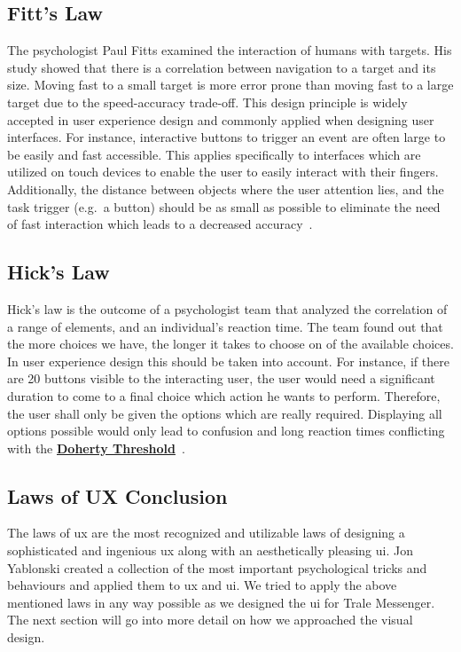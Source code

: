 \subsection{Fitt's Law}\label{subsec:fitt's-law}
The psychologist Paul Fitts examined the interaction of humans with targets.
His study showed that there is a correlation between navigation to a target and its size.
Moving fast to a small target is more error prone than moving fast to a large target due to the speed-accuracy trade-off.
This design principle is widely accepted in user experience design and commonly applied when designing user interfaces.
For instance, interactive buttons to trigger an event are often large to be easily and fast accessible.
This applies specifically to interfaces which are utilized on touch devices to enable the user to easily interact with
their fingers.
Additionally, the distance between objects where the user attention lies, and the task trigger (e.g.\ a button) should be
as small as possible to eliminate the need of fast interaction which leads to a decreased accuracy~\cite{lawsofuxFL}.

\subsection{Hick's Law}\label{subsec:hick's-law}
Hick's law is the outcome of a psychologist team that analyzed the correlation of a range of elements, and an
individual's reaction time.
The team found out that the more choices we have, the longer it takes to choose on of the available choices.
In user experience design this should be taken into account.
For instance, if there are 20 buttons visible to the interacting user, the user would need a significant duration to
come to a final choice which action he wants to perform.
Therefore, the user shall only be given the options which are really required.
Displaying all options possible would only lead to confusion and long reaction times conflicting with the
\textbf{\hyperref[subsec:doherty-threshold]{Doherty Threshold}}~\cite{lawsofuxHL}.

\subsection{Laws of UX Conclusion}\label{subsec:laws-of-ux-conclusion}
The laws of \ac{ux} are the most recognized and utilizable laws of designing a sophisticated and ingenious \ac{ux}
along with an aesthetically pleasing \ac{ui}.
Jon Yablonski created a collection of the most important psychological tricks and behaviours and applied them to
\ac{ux} and \ac{ui}.
We tried to apply the above mentioned laws in any way possible as we designed the \ac{ui} for Trale Messenger.
The next section will go into more detail on how we approached the visual design.

